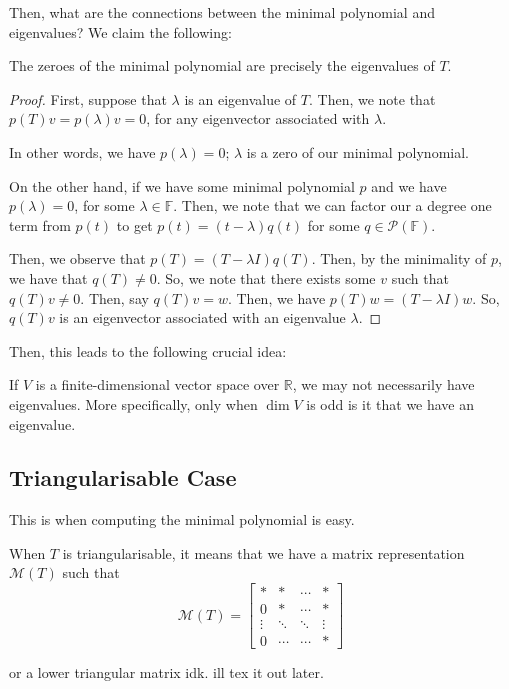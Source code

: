 \documentclass[openany]{book}
\newcommand{\RR}{\mathbb{R}}
\begin{document}
Then, what are the connections between the minimal polynomial and eigenvalues? We claim the following:

\begin{thm}
	The zeroes of the minimal polynomial are precisely the eigenvalues of $T$.
\end{thm}
\begin{proof}
	First, suppose that $\lambda$ is an eigenvalue of $T$. Then, we note that $p(T)v = p(\lambda)v = 0$, for any eigenvector associated with $\lambda$.
	
	In other words, we have $p(\lambda) = 0$; $\lambda$ is a zero of our minimal polynomial.
	
	On the other hand, if we have some minimal polynomial $p$ and we have $p(\lambda) = 0$, for some $\lambda \in \mathbb{F}$. Then, we note that we can factor our a degree one term from $p(t)$ to get $p(t) = (t-\lambda)q(t)$ for some $q \in \mathscr{P}(\mathbb{F})$.
	
	Then, we observe that $p(T) = (T-\lambda I)q(T)$. Then, by the minimality of $p$, we have that $q(T) \neq 0$. So, we note that there exists some $v$ such that $q(T)v \neq 0$. Then, say $q(T)v = w$. Then, we have $p(T)w = (T-\lambda I)w$. So, $q(T)v$ is an eigenvector associated with an eigenvalue $\lambda$.
\end{proof}
	
	Then, this leads to the following crucial idea:
	\begin{thm}
		If $V$ is a finite-dimensional vector space over $\RR$, we may not necessarily have eigenvalues. More specifically, only when $\dim V$ is odd is it that we have an eigenvalue.
	\end{thm}

\subsection{Triangularisable Case}
This is when computing the minimal polynomial is easy.

\begin{defn}[Triangularisability]
	When $T$ is triangularisable, it means that we have a matrix representation $\mathcal M (T)$ such that
	\begin{equation*}
		\mathcal M(T) =
		\begin{bmatrix}
			* & * & \cdots & * \\
			0 & * & \cdots & * \\
			\vdots & \ddots & \ddots & \vdots \\
			0 & \cdots & \cdots & *
		\end{bmatrix}
	\end{equation*}

	or a lower triangular matrix idk. ill tex it out later.
\end{defn}
\end{document}
